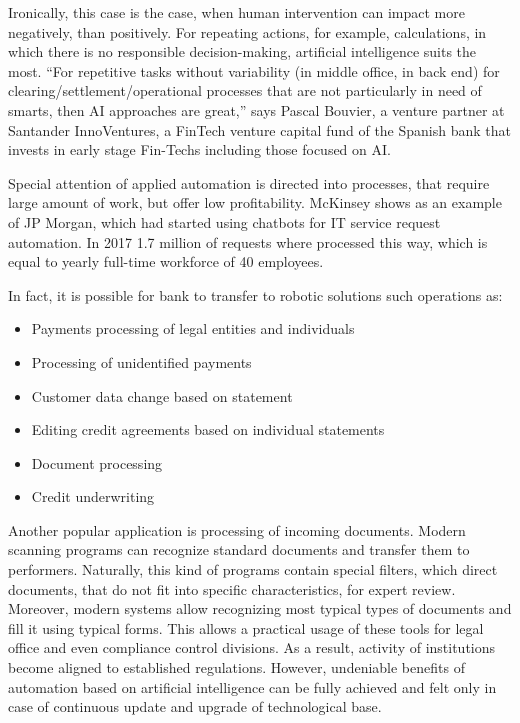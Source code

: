 Ironically, this case is the case, when human intervention can impact more negatively, than positively.
For repeating actions, for example, calculations, in which there is no responsible decision-making, artificial intelligence suits the most.
“For repetitive tasks without variability (in middle office, in back end) for clearing/settlement/operational processes that are not particularly in need of smarts, 
then AI approaches are great,” says Pascal Bouvier, a venture partner at Santander InnoVentures, a FinTech venture capital fund of the Spanish bank that invests in early stage Fin-Techs including those focused on AI.
\cite{ai_reality_hype}

Special attention of applied automation is directed into processes, that require large amount of work, but offer low profitability.
McKinsey shows as an example of JP Morgan, which had started using chatbots for IT service request automation.
In 2017 1.7 million of requests where processed this way, which is equal to yearly full-time workforce of 40 employees.
\cite{ways_ai_transforming_bi}

In fact, it is possible for bank to transfer to robotic solutions such operations as:
\begin{itemize}[noitemsep]
    \item Payments processing of legal entities and individuals
    \item Processing of unidentified payments
    \item Customer data change based on statement
    \item Editing credit agreements based on individual statements
    \item Document processing
    \item Credit underwriting
\end{itemize}

Another popular application is processing of incoming documents.
Modern scanning programs can recognize standard documents and transfer them to performers.
Naturally, this kind of programs contain special filters, which direct documents, that do not fit into specific characteristics, for expert review.
Moreover, modern systems allow recognizing most typical types of documents and fill it using typical forms.
This allows a practical usage of these tools for legal office and even compliance control divisions.
As a result, activity of institutions become aligned to established regulations.
However, undeniable benefits of automation based on artificial intelligence can be fully achieved and felt only in case of continuous update and upgrade of technological base.
\cite{banking_ai_revolution}


